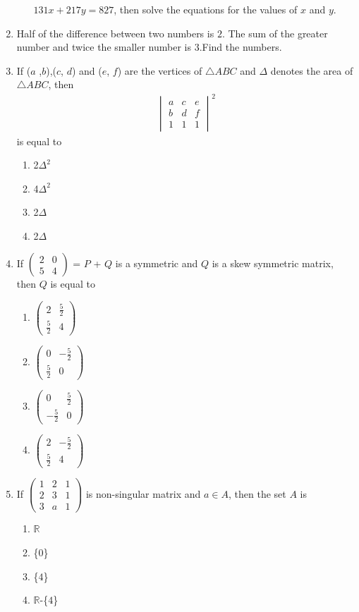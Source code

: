 \documentclass[12pt,-letter paper]{article}\usepackage{siunitx}
\newcommand{\mydet}[1]{\ensuremath{\begin{vmatrix}#1\end{vmatrix}}}
\newcommand{\myvec}[1]{\ensuremath{\begin{pmatrix}#1\end{pmatrix}}}
\providecommand{\mydet}[1]{\ensuremath{\begin{vmatrix}#1\end{vmatrix}}}
\providecommand{\myvec}[1]{\ensuremath{\begin{bmatrix}#1\end{bmatrix}}}
\begin{document}
\begin{enumerate}
\begin{enumerate}[label=(\alph*)]
$131x + 217y = 827$,\hspace{4pt}  then solve the equations for the values of $x$ and $y$.
\end{enumerate}
\item Half of the difference between two numbers is $2$. The sum of the greater number and twice the smaller number is $3$.Find the numbers.
\item If ($a$ ,$b$),($c$, $d$) and ($e$, $f$) are the vertices of $\triangle$$ABC$ and $\Delta$ denotes the area of $\triangle$$ABC$, then 
  \begin{align}
      \mydet{a & c & e\\b & d& f\\1&1&1}^2 
  \end{align}  
 is equal to
\begin{enumerate}[label=(\alph*)]
    \item 2$\Delta ^2$
    \item 4$\Delta ^2$ 
    \item 2$\Delta$
    \item 2$\Delta$
\end{enumerate}
    \item If $\myvec{2 & 0 \\5 & 4}$ = $P$ + $Q$ 
is a symmetric and $Q$ is a skew symmetric matrix, then $Q$ is equal to
\begin{enumerate}[label=(\alph*)]
    \item $\myvec{2  & \frac{5}{2} \\\frac{5}{2} & 4 }$
    \item $\myvec{ 0 & -\frac{5}{2} \\\frac{5}{2} & 0}$
    \item $\myvec{ 0 & \frac{5}{2} \\-\frac{5}{2} & 0}$
    \item $\myvec{2 & -\frac{5}{2} \\\frac{5}{2} & 4 }$
\end{enumerate}
\item If $\myvec{1 & 2 & 1 \\2 & 3 & 1 \\3 & a & 1}$
is non-singular matrix and  $a \in A $, then the set $A$ is 
\begin{enumerate}[label=(\alph*)]
    \item $\mathbb{R}$
    \item \{$0$\}
    \item \{$4$\}
    \item $\mathbb{R}$-\{$4$\}

\end{enumerate}
\end{enumerate}
\end{document}

